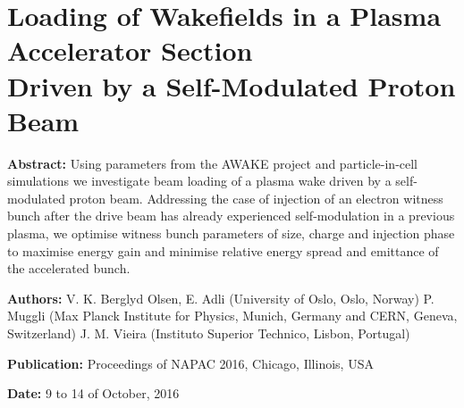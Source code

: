 %
%

\chapter{Loading of Wakefields in a Plasma Accelerator Section\\ Driven by a Self-Modulated Proton Beam}
\label{Pub:NAPAC16}

\begin{hangparas}{10mm}{1}

    \textbf{Abstract:}
    Using parameters from the AWAKE project and particle-in-cell simulations we investigate beam loading of a plasma
    wake driven by a self-modulated proton beam. Addressing the case of injection of an electron witness bunch after the
    drive beam has already experienced self-modulation in a previous plasma, we optimise witness bunch parameters of
    size, charge and injection phase to maximise energy gain and minimise relative energy spread and emittance of the
    accelerated bunch.

    \vspace{5mm}

    \textbf{Authors:}
    V. K. Berglyd Olsen, E. Adli (University of Oslo, Oslo, Norway)
    P. Muggli (Max Planck Institute for Physics, Munich, Germany and CERN, Geneva, Switzerland)
    J. M. Vieira (Instituto Superior Technico, Lisbon, Portugal)

    \vspace{5mm}

    \textbf{Publication:}
    Proceedings of NAPAC 2016, Chicago, Illinois, USA

    \vspace{5mm}

    \textbf{Date:} 9 to 14 of October, 2016
    

\end{hangparas}
